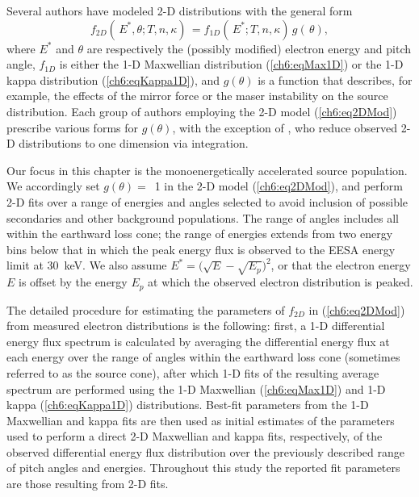   Several authors \citep{Maggs1981,Bingham1999,Bingham2000,Mutel2007} have
  modeled 2-D distributions with the general form
    \begin{equation} \label{ch6:eq2DMod} f_{2D}(\, E^*, \theta ; T, n,
      \kappa) \, = f_{1D}(\, E^*; T, n, \kappa) \, g(\, \theta),
    \end{equation}
  where $E^*$ and $\theta$ are respectively the (possibly modified) electron
  energy and pitch angle, $f_{1D}$ is either the 1-D Maxwellian distribution
  (\ref{ch6:eqMax1D}) or the 1-D kappa distribution (\ref{ch6:eqKappa1D}), and
  $g(\theta )$ is a function that describes, for example, the effects of the
  mirror force or the maser instability on the source distribution. Each group
  of authors employing the 2-D model (\ref{ch6:eq2DMod}) prescribe various forms
  for $g(\theta)$, with the exception of \citet{Pritchett1999}, who reduce
  observed 2-D distributions to one dimension via integration.

  Our focus in this chapter is the monoenergetically accelerated source
  population. We accordingly set $g(\theta) =$~1 in the 2-D model
  (\ref{ch6:eq2DMod}), and perform 2-D fits over a range of energies and angles
  selected to avoid inclusion of possible secondaries and other background
  populations. The range of angles includes all within the earthward loss cone;
  the range of energies extends from two energy bins below that in which the
  peak energy flux is observed to the EESA energy limit at 30~keV. We also
  assume $E^* = \big( \sqrt{E} - \sqrt{E_p} \big)^2$, or that the electron
  energy $E$ is offset by the energy $E_p$ at which the observed electron
  distribution is peaked.

  The detailed procedure for estimating the parameters of $f_{2D}$ in
  (\ref{ch6:eq2DMod}) from measured electron distributions is the following:
  first, a 1-D differential energy flux spectrum is calculated by averaging the
  differential energy flux at each energy over the range of angles within the
  earthward loss cone (sometimes referred to as the source cone), after which
  1-D fits of the resulting average spectrum are performed using the 1-D
  Maxwellian (\ref{ch6:eqMax1D}) and 1-D kappa (\ref{ch6:eqKappa1D})
  distributions. Best-fit parameters from the 1-D Maxwellian and kappa fits are
  then used as initial estimates of the parameters used to perform a direct 2-D
  Maxwellian and kappa fits, respectively, of the observed differential energy
  flux distribution over the previously described range of pitch angles and
  energies. Throughout this study the reported fit parameters are those
  resulting from 2-D fits.

